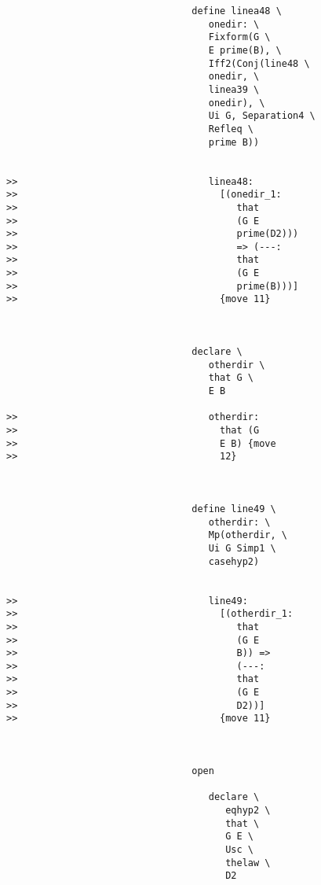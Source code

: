 \documentclass[12pt]{article}
\begin{document}
\begin{verbatim}
                                 define linea48 \
                                    onedir: \
                                    Fixform(G \
                                    E prime(B), \
                                    Iff2(Conj(line48 \
                                    onedir, \
                                    linea39 \
                                    onedir), \
                                    Ui G, Separation4 \
                                    Refleq \
                                    prime B))


>>                                  linea48:
>>                                    [(onedir_1:
>>                                       that
>>                                       (G E
>>                                       prime(D2)))
>>                                       => (---:
>>                                       that
>>                                       (G E
>>                                       prime(B)))]
>>                                    {move 11}



                                 declare \
                                    otherdir \
                                    that G \
                                    E B

>>                                  otherdir:
>>                                    that (G
>>                                    E B) {move
>>                                    12}



                                 define line49 \
                                    otherdir: \
                                    Mp(otherdir, \
                                    Ui G Simp1 \
                                    casehyp2)


>>                                  line49:
>>                                    [(otherdir_1:
>>                                       that
>>                                       (G E
>>                                       B)) =>
>>                                       (---:
>>                                       that
>>                                       (G E
>>                                       D2))]
>>                                    {move 11}



                                 open

                                    declare \
                                       eqhyp2 \
                                       that \
                                       G E \
                                       Usc \
                                       thelaw \
                                       D2


\end{verbatim}
\end{document}
